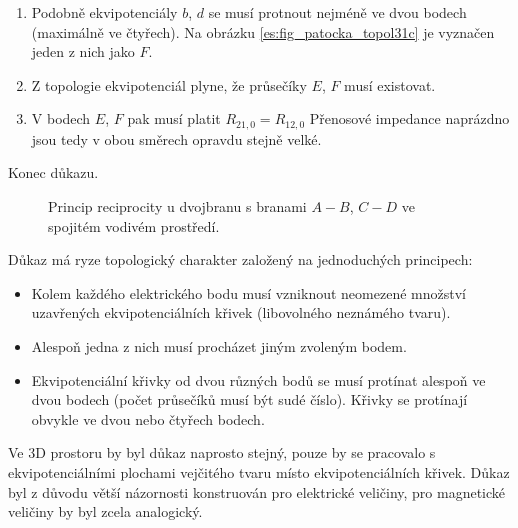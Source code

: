 \begin{enumerate}[noitemsep]
          \item Podobně ekvipotenciály \(b\), \(d\) se musí protnout nejméně ve dvou bodech 
                (maximálně ve čtyřech). Na obrázku \ref{es:fig_patocka_topol31c} je vyznačen jeden 
                z nich jako \(F\).
          
          \item Z topologie ekvipotenciál plyne, že průsečíky \(E\), \(F\) musí existovat.
          
          \item V bodech \(E\), \(F\) pak musí platit \(R_{21,0} = R_{12,0}\) Přenosové impedance 
                naprázdno jsou tedy v obou směrech opravdu stejně velké.
        \end{enumerate}
        Konec důkazu.
        \begin{figure}[ht!]
          \centering  
             \newline
             \newline
          \caption{Princip reciprocity u dvojbranu s branami \(A-B\), \(C-D\) ve spojitém vodivém 
                   prostředí. \cite[s.~65]{Patocka4}} 
          \label{es:fig_patocka_topol31}
        \end{figure} 
        
        Důkaz má ryze topologický charakter založený na jednoduchých principech:
        \begin{itemize}[noitemsep]
          \item Kolem každého elektrického bodu musí vzniknout neomezené množství uzavřených 
              ekvipotenciálních křivek (libovolného neznámého tvaru).
        
          \item Alespoň jedna z nich musí procházet jiným zvoleným bodem.
        
          \item Ekvipotenciální křivky od dvou různých bodů se musí protínat alespoň ve dvou bodech 
                (počet průsečíků musí být sudé číslo). Křivky se protínají obvykle ve dvou nebo 
                čtyřech bodech.
      \end{itemize}
      
        Ve 3D prostoru by byl důkaz naprosto stejný, pouze by se pracovalo s ekvipotenciálními 
        plochami vejčitého tvaru místo ekvipotenciálních křivek. Důkaz byl z důvodu větší 
        názornosti konstruován pro elektrické veličiny, pro magnetické veličiny by byl zcela 
        analogický.

